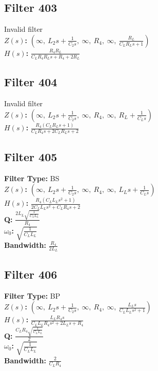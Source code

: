 \documentclass{article}
\begin{document}
\subsection*{Filter 403}
Invalid filter \\ 
\textbf{$Z(s)$:} $\left( \infty, \  L_{2} s + \frac{1}{C_{2} s}, \  \infty, \  R_{4}, \  \infty, \  \frac{R_{L}}{C_{L} R_{L} s + 1}\right)$ \\ 
\textbf{$H(s)$:} $\frac{R_{4} R_{L}}{C_{L} R_{4} R_{L} s + R_{4} + 2 R_{L}}$ \\ 
\subsection*{Filter 404}
Invalid filter \\ 
\textbf{$Z(s)$:} $\left( \infty, \  L_{2} s + \frac{1}{C_{2} s}, \  \infty, \  R_{4}, \  \infty, \  R_{L} + \frac{1}{C_{L} s}\right)$ \\ 
\textbf{$H(s)$:} $\frac{R_{4} \left(C_{L} R_{L} s + 1\right)}{C_{L} R_{4} s + 2 C_{L} R_{L} s + 2}$ \\ 
\subsection*{Filter 405}
\textbf{Filter Type:} BS \\ 
\textbf{$Z(s)$:} $\left( \infty, \  L_{2} s + \frac{1}{C_{2} s}, \  \infty, \  R_{4}, \  \infty, \  L_{L} s + \frac{1}{C_{L} s}\right)$ \\ 
\textbf{$H(s)$:} $\frac{R_{4} \left(C_{L} L_{L} s^{2} + 1\right)}{2 C_{L} L_{L} s^{2} + C_{L} R_{4} s + 2}$ \\ 
\textbf{Q:} $\frac{2 L_{L} \sqrt{\frac{1}{C_{L} L_{L}}}}{R_{4}}$ \\ 
\textbf{$\omega_0$:} $\sqrt{\frac{1}{C_{L} L_{L}}}$ \\ 
\textbf{Bandwidth:} $\frac{R_{4}}{2 L_{L}}$ \\ 
\subsection*{Filter 406}
\textbf{Filter Type:} BP \\ 
\textbf{$Z(s)$:} $\left( \infty, \  L_{2} s + \frac{1}{C_{2} s}, \  \infty, \  R_{4}, \  \infty, \  \frac{L_{L} s}{C_{L} L_{L} s^{2} + 1}\right)$ \\ 
\textbf{$H(s)$:} $\frac{L_{L} R_{4} s}{C_{L} L_{L} R_{4} s^{2} + 2 L_{L} s + R_{4}}$ \\ 
\textbf{Q:} $\frac{C_{L} R_{4} \sqrt{\frac{1}{C_{L} L_{L}}}}{2}$ \\ 
\textbf{$\omega_0$:} $\sqrt{\frac{1}{C_{L} L_{L}}}$ \\ 
\textbf{Bandwidth:} $\frac{2}{C_{L} R_{4}}$ \\ 
\end{document}
